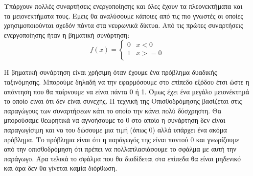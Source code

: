 Υπάρχουν πολλές συναρτήσεις ενεργοποίησης και όλες έχουν τα πλεονεκτήματα και τα μειονεκτήματα τους. Εμεις θα αναλύσουμε κάποιες από τις πιο γνωστές οι οποίες χρησιμοποιούνται σχεδόν πάντα στα νευρωνικά δίκτυα.
Από τις πρώτες συναρτήσεις ενεργοποίησης ήταν η βηματική συνάρτηση:
\[f(x)=\left\{\begin{array}{ll}0 & x<0 \\ 1 & x>=0 \\ \end{array} \right.\]
\begin{figure}[H]
    \centering
    \caption{}
\end{figure}
Η βηματική συνάρτηση είναι χρήσιμη όταν έχουμε ένα πρόβλημα δυαδικής ταξινόμησης. Μπορούμε δηλαδή να την εφαρμόσουμε στο επίπεδο εξόδου έτσι ώστε η απάντηση που θα παίρνουμε να είναι πάντα  0 ή 1. Όμως έχει ένα μεγάλο μειονέκτημά το οποίο
είναι ότι δεν είναι συνεχής. Η τεχνική της Οπισθοδρόμησης βασίζεται στις παραγώγους των συναρτήσεων κάτι το οποίο την κάνει πολύ δύσχρηστη. Θα μπορούσαμε θεωρητικά να αγνοήσουμε το 0 στο οποίο η συνάρτηση δεν είναι παραγωγίσιμη και να του
δώσουμε μια τιμή (όπως 0) αλλά υπάρχει ένα ακόμα πρόβλημα. Το πρόβλημα είναι ότι η παράγωγός της είναι παντού 0 και γνωρίζουμε από την οπισθοδρόμηση ότι πρέπει να πολλαπλασιάσουμε το σφάλμα με αυτή την παράγωγο. Άρα τελικά το σφάλμα που θα διαδίδεται στα επίπεδα θα είναι μηδενικό και άρα δεν θα γίνεται καμία διόρθωση.

